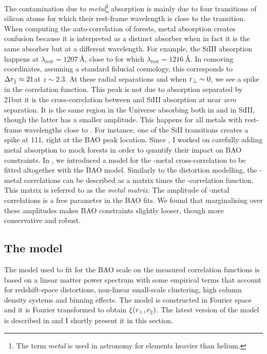 The contamination due to \emph{metal}\footnote{The term \emph{metal} is used in 
astronomy for elements heavier than helium.} 
absorption is mainly due to four transitions of silicon atoms for which their 
rest-frame wavelength is close to the \lya transition. When computing the 
auto-correlation of forests, metal absorption creates confusion because 
it is interpreted as a distinct \lya absorber when in fact it is the same
absorber but at a different wavelength.
For example, the \textsc{SiIII} absorption happens at 
$\lambda_\mathrm{rest} = \qty{1207}{\angstrom}$, close to \lya for which $\lambda_\mathrm{rest} = \qty{1216}{\angstrom}$. 
In comoving coordinates, assuming a standard fiducial cosmology, this corresponds
to $\Delta {r_\parallel} \approx 21$\hmpc at $z \sim 2.3$. 
At these radial separations and when ${r_\perp} \sim 0$, we see a 
spike in the correlation function. 
This peak is not due to \lya absorption 
separated by 21\hmpc but it is the cross-correlation between \lya and \textsc{SiIII}
absorption at near \emph{zero} separation. 
It is the same region in the Universe absorbing both in \lya and in \textsc{SiIII}, 
though the latter has a smaller amplitude. 
This happens for all metals with rest-frame wavelengths close to \lya. 
For instance, one of the \textsc{SiII} transitions creates a spike at 111\hmpc, right at the BAO peak location. 
Since \cite{delubacBaryonAcousticOscillations2015}, I worked on carefully 
adding metal absorption to mock forests in order to quantify their impact on 
BAO constraints. In \cite{bautistaMeasurementBaryonAcoustic2017}, we introduced 
a model for the \lya-metal cross-correlation to be fitted altogether with the 
BAO model. Similarly to the distortion modelling, the \lya-metal correlations 
can be described as a matrix times the \lya-\lya correlation function. 
This matrix is referred to as the \emph{metal matrix}. The amplitude of 
\lya-metal correlations is a free parameter in the BAO fits. 
We found that marginalising over these amplitudes makes BAO constraints 
slightly looser, though more conservative and robust.   

\subsection{The model}
\label{forests:bao:model}

The model used to fit for the BAO scale on the measured correlation functions 
is based on a linear matter power spectrum with some empirical terms 
that account for redshift-space distortions, non-linear small-scale clustering, 
high column density systems and binning effects. The model is constructed in 
Fourier space and it is Fourier transformed to obtain $\xi({r_\perp}, {r_\parallel})$. 
The latest version of the model is described in \cite{dumasdesbourbouxhelionCompletedSDSSIVExtended2020}
and I shortly present it in this section. 

